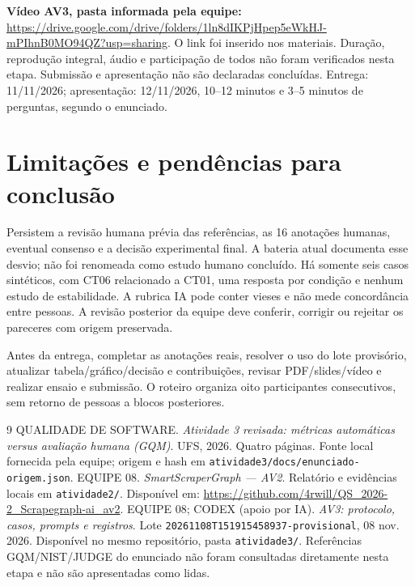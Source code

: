 \documentclass[a4paper,12pt]{article}
\newcommand{\arquivo}[1]{\nolinkurl{#1}}
\begin{document}
\textbf{Vídeo AV3, pasta informada pela equipe:} \url{https://drive.google.com/drive/folders/1ln8dIKPjHpep5eWkHJ-mPIhnB0MO94QZ?usp=sharing}.
O link foi inserido nos materiais. Duração, reprodução integral, áudio e participação de todos não foram verificados nesta etapa. Submissão e apresentação não são declaradas concluídas. Entrega: 11/11/2026; apresentação: 12/11/2026, 10--12 minutos e 3--5 minutos de perguntas, segundo o enunciado.

\section{Limitações e pendências para conclusão}
Persistem a revisão humana prévia das referências, as 16 anotações humanas, eventual consenso e a decisão experimental final. A bateria atual documenta esse desvio; não foi renomeada como estudo humano concluído. Há somente seis casos sintéticos, com CT06 relacionado a CT01, uma resposta por condição e nenhum estudo de estabilidade. A rubrica IA pode conter vieses e não mede concordância entre pessoas. A revisão posterior da equipe deve conferir, corrigir ou rejeitar os pareceres com origem preservada.

Antes da entrega, completar as anotações reais, resolver o uso do lote provisório, atualizar tabela/gráfico/decisão e contribuições, revisar PDF/slides/vídeo e realizar ensaio e submissão. O roteiro organiza oito participantes consecutivos, sem retorno de pessoas a blocos posteriores.

\begin{thebibliography}{9}
 QUALIDADE DE SOFTWARE. \textit{Atividade 3 revisada: métricas automáticas versus avaliação humana (GQM)}. UFS, 2026. Quatro páginas. Fonte local fornecida pela equipe; origem e hash em \arquivo{atividade3/docs/enunciado-origem.json}.
 EQUIPE 08. \textit{SmartScraperGraph --- AV2}. Relatório e evidências locais em \arquivo{atividade2/}. Disponível em: \url{https://github.com/4rwill/QS_2026-2_Scrapegraph-ai_av2}.
 EQUIPE 08; CODEX (apoio por IA). \textit{AV3: protocolo, casos, prompts e registros}. Lote \arquivo{20261108T151915458937-provisional}, 08 nov. 2026. Disponível no mesmo repositório, pasta \arquivo{atividade3/}. Referências GQM/NIST/JUDGE do enunciado não foram consultadas diretamente nesta etapa e não são apresentadas como lidas.
\end{thebibliography}
\end{document}
